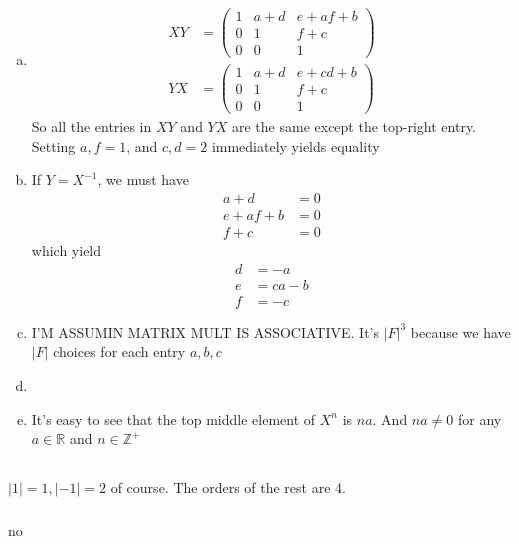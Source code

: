 \documentclass{article}
\newcommand{\ints}{\mathbb{Z}}
\newcommand{\reals}{\mathbb{R}}
\newcommand{\inv}[1]{ {#1}^{-1} }
\begin{document}
\subsubsection{}\label{ex4p11}
\begin{enumerate}[(a)]
\item \label{11a}
\begin{align*}
XY &= 
\begin{pmatrix}
1	&	a+d	&	e+af+b\\
0	&	1	&	f+c\\
0	&	0	&	1
\end{pmatrix}\\
YX &= 
\begin{pmatrix}
1	&	a+d	&	e+cd+b\\
0	&	1	&	f+c\\
0	&	0	&	1
\end{pmatrix}
\end{align*}
So all the entries in $XY$ and $YX$ are the same except the top-right entry. Setting $a,f=1$, and $c,d=2$ immediately yields equality
\item \label{11b}
If $Y = \inv{X}$, we must have
\begin{align*}
a+d &= 0\\
e + af + b &= 0\\
f+c &= 0
\end{align*}
which yield
\begin{align*}
d &= -a\\
e &= ca - b\\
f &= -c
\end{align*}
\item \label{11c}
I'M ASSUMIN MATRIX MULT IS ASSOCIATIVE. It's $|F|^3$ because we have $|F|$ choices for each entry $a,b,c$
\item \label{11d}
\item \label{11e}
It's easy to see that the top middle element of $X^n$ is $na$. And $na \neq 0$ for any $a \in \reals$ and $n \in \ints^+$
\end{enumerate}
\subsection{}
\subsubsection{}
$|1| = 1, |-1| = 2$ of course. The orders of the rest are $4$.
\subsubsection{}
no
\end{document}
